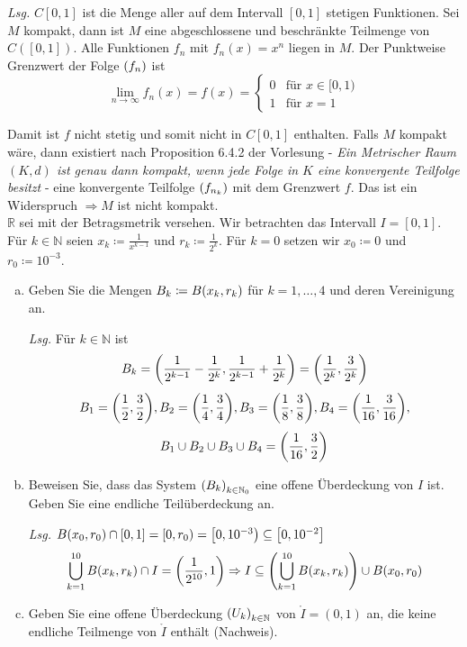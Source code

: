 \documentclass{scrreprt}
\begin{document}
\textit{Lsg.} $C[0, 1]$ ist die Menge aller auf dem Intervall $[0, 1]$ stetigen
Funktionen.
Sei $M$ kompakt, dann ist $M$ eine abgeschlossene und beschränkte Teilmenge von
$C([0, 1])$.
Alle Funktionen $f_n$ mit $f_n(x) = x^n$ liegen in $M$.
Der Punktweise Grenzwert der Folge $\qty(f_n)$ ist
\[
  \lim_{n \to \infty} f_n(x) = f(x) = \begin{cases}
    0 & \text{für } x \in [0, 1) \\
    1 & \text{für } x = 1
  \end{cases}
\]

Damit ist $f$ nicht stetig und somit nicht in $C[0, 1]$ enthalten.
Falls $M$ kompakt wäre, dann existiert nach Proposition 6.4.2 der Vorlesung -
\textit{Ein Metrischer Raum $(K, d)$ ist genau dann kompakt, wenn jede Folge in
  $K$ eine konvergente Teilfolge besitzt} - eine konvergente Teilfolge
$\qty(f_{n_k})$ mit dem Grenzwert $f$.
Das ist ein Widerspruch $\Rightarrow M$ ist nicht kompakt. \\

\noindent
$\mathbb{R}$ sei mit der Betragsmetrik versehen.
Wir betrachten das Intervall $I = [0, 1]$.
Für $k \in \mathbb{N}$ seien $x_k \coloneqq \frac{1}{x^{k - 1}}$ und
$r_k \coloneqq \frac{1}{2^k}$.
Für $k = 0$ setzen wir $x_0 \coloneqq 0$ und $r_0 \coloneqq 10^{-3}$.
\begin{enumerate}[a)]
\item Geben Sie die Mengen $B_k \coloneqq B\qty(x_k, r_k)$ für
  $k = 1, \ldots, 4$ und deren Vereinigung an.

  \textit{Lsg.} Für $k \in \mathbb{N}$ ist
  \[
    B_k = \qty(\frac{1}{2^{k - 1}} - \frac{1}{2^k}, \frac{1}{2^{k - 1}} + \frac{1}{2^k}) =
    \qty(\frac{1}{2^k}, \frac{3}{2^k})
  \]
  \[
    B_1 = \qty(\frac{1}{2}, \frac{3}{2}), B_2 = \qty(\frac{1}{4}, \frac{3}{4}),
    B_3 = \qty(\frac{1}{8}, \frac{3}{8}), B_4 = \qty(\frac{1}{16}, \frac{3}{16}),
  \]
  \[
    B_1 \cup B_2 \cup B_3 \cup B_4 = \qty(\frac{1}{16}, \frac{3}{2})
  \]

\item Beweisen Sie, dass das System $\qty(B_k)_{k \in \mathbb{N}_0}$ eine
  offene Überdeckung von $I$ ist.
  Geben Sie eine endliche Teilüberdeckung an.

  \textit{Lsg.} $B\qty(x_0, r_0) \cap [0, 1] = \left[0, r_0\right) = \left[0, 10^{-3}\right) \subseteq \qty[0, 10^{-2}]$
  \[
    \bigcup_{k = 1}^{10} B\qty(x_k, r_k) \cap I = \qty(\frac{1}{2^{10}}, 1) \Rightarrow
    I \subseteq \qty(\bigcup_{k = 1}^{10} B\qty(x_k, r_k)) \cup B\qty(x_0, r_0)
  \]

\item Geben Sie eine offene Überdeckung $\qty(U_k)_{k \in \mathbb{N}}$ von
  $\mathring I = (0, 1)$ an, die keine endliche Teilmenge von $\mathring I$
  enthält (Nachweis).

\end{enumerate}
\end{document}
